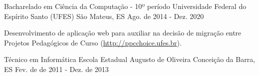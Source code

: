 

\begin{cventries}

  \cventry
    {Bacharelado em Ciência da Computação - 10º período} %
    {Universidade Federal do Espírito Santo (UFES)} %
    {São Mateus, ES} %
    {Ago. de 2014 - Dez. 2020} %
    {
      \begin{cvitems} %
        \item {Desenvolvimento de aplicação web para auxiliar na decisão de migração entre Projetos Pedagógicos de Curso (\url{http://ppcchoice.ufes.br}).}
      \end{cvitems}
    }
  \cventry
{Técnico em Informática} %
{Escola Estadual Augusto de Oliveira} %
{Conceição da Barra, ES} %
{Fev. de de 2011 - Dez. de 2013} %
{
	      \begin{cvitems} %
	      \end{cvitems}
}

\end{cventries}
